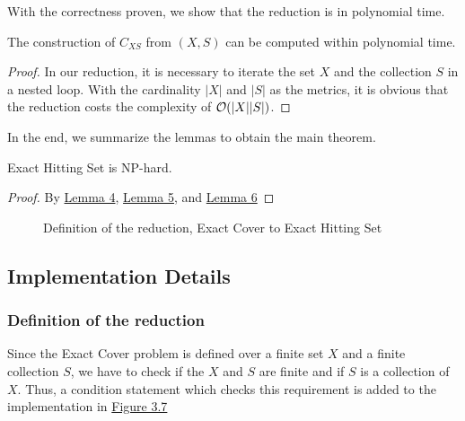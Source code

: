 With the correctness proven, we show that the reduction is in polynomial time. 
\begin{lemma}
    \label{lemma:6}
    The construction of $C_{XS}$ from $(X, S)$ can be computed within polynomial time. 
\end{lemma}
\begin{proof}
    In our reduction, it is necessary to iterate the set $X$ and the collection $S$ in a nested loop. 
With the cardinality $|X|$ and $|S|$ as the metrics, it is obvious that the reduction costs the complexity of $\mathcal{O}({|X||S|})$.
\end{proof}
In the end, we summarize the lemmas to obtain the main theorem.
\begin{theorem}
    Exact Hitting Set is NP-hard.
\end{theorem}
\begin{proof}
    By \hyperref[lemma:4]{Lemma 4}, \hyperref[lemma:5]{Lemma 5}, and \hyperref[lemma:6]{Lemma 6}
\end{proof}

\begin{figure}[!ht]
    \caption{Definition of the reduction, Exact Cover to Exact Hitting Set}
    \label{fig:8}
\end{figure}

\subsection{Implementation Details}
\subsubsection{Definition of the reduction}
Since the Exact Cover problem is defined over a finite set $X$ and a finite collection $S$, we have to check if the $X$ and $S$ are finite and 
if $S$ is a collection of $X$. Thus, a condition statement which checks this requirement is added to the implementation in \hyperref[fig:8]{Figure 3.7}
